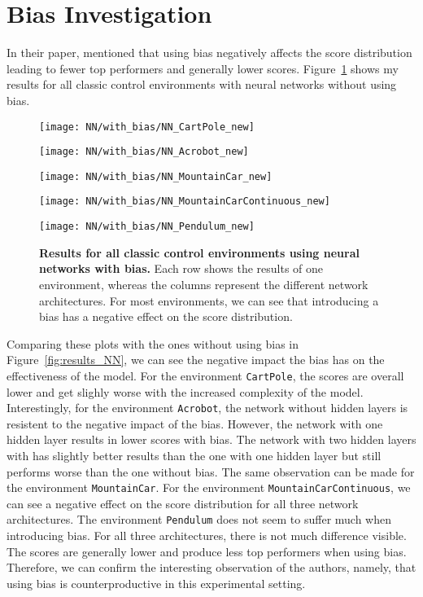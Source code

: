 \section{Bias Investigation}
In their paper, \citet{oller_analyzing_2020} mentioned that using bias negatively affects the score distribution leading to fewer top performers and generally lower scores. Figure~\ref{fig:results_NN_bias} shows my results for all classic control environments with neural networks without using bias.
\begin{figure}
  \centering
  \texttt{[image: NN/with\_bias/NN\_CartPole\_new]}

  \vspace{0.2cm}

  \texttt{[image: NN/with\_bias/NN\_Acrobot\_new]}

  \vspace{0.2cm}

  \texttt{[image: NN/with\_bias/NN\_MountainCar\_new]}

  \vspace{0.2cm}

  \texttt{[image: NN/with\_bias/NN\_MountainCarContinuous\_new]}

  \vspace{0.2cm}

  \texttt{[image: NN/with\_bias/NN\_Pendulum\_new]}
\caption[Results for all classic control environments using neural networks with bias]{
  \textbf{Results for all classic control environments using neural networks with bias.}
   Each row shows the results of one environment, whereas the columns represent the different network architectures. For most environments, we can see that introducing a bias has a negative effect on the score distribution.
}
\label{fig:results_NN_bias}
\end{figure}
Comparing these plots with the ones without using bias in Figure~\ref{fig:results_NN}, we can see the negative impact the bias has on the effectiveness of the model. For the environment \verb|CartPole|, the scores are overall lower and get slighly worse with the increased complexity of the model. Interestingly, for the environment \verb|Acrobot|, the network without hidden layers is resistent to the negative impact of the bias. However, the network with one hidden layer results in lower scores with bias. The network with two hidden layers with has slightly better results than the one with one hidden layer but still performs worse than the one without bias. The same observation can be made for the environment \verb|MountainCar|. For the environment \verb|MountainCarContinuous|, we can see a negative effect on the score distribution for all three network architectures. The environment \verb|Pendulum| does not seem to suffer much when introducing bias. For all three architectures, there is not much difference visible. The scores are generally lower and produce less top performers when using bias. Therefore, we can confirm the interesting observation of the authors, namely, that using bias is counterproductive in this experimental setting.

